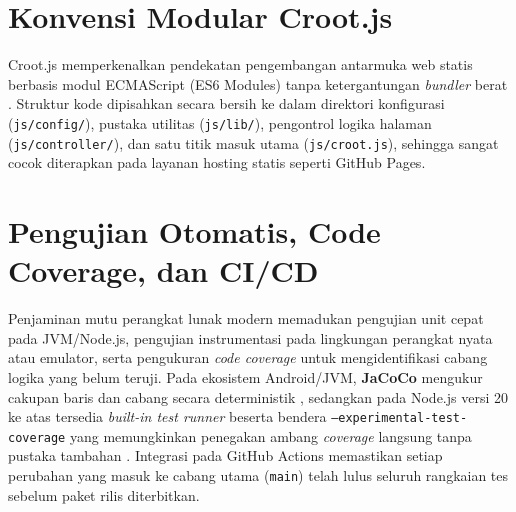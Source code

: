 \section{Konvensi Modular Croot.js}
Croot.js memperkenalkan pendekatan pengembangan antarmuka web statis berbasis modul ECMAScript (ES6 Modules) tanpa ketergantungan \textit{bundler} berat \cite{crootjs_repo}. Struktur kode dipisahkan secara bersih ke dalam direktori konfigurasi (\texttt{js/config/}), pustaka utilitas (\texttt{js/lib/}), pengontrol logika halaman (\texttt{js/controller/}), dan satu titik masuk utama (\texttt{js/croot.js}), sehingga sangat cocok diterapkan pada layanan hosting statis seperti GitHub Pages.

\section{Pengujian Otomatis, Code Coverage, dan CI/CD}
Penjaminan mutu perangkat lunak modern memadukan pengujian unit cepat pada JVM/Node.js, pengujian instrumentasi pada lingkungan perangkat nyata atau emulator, serta pengukuran \textit{code coverage} untuk mengidentifikasi cabang logika yang belum teruji. Pada ekosistem Android/JVM, \textbf{JaCoCo} mengukur cakupan baris dan cabang secara deterministik \cite{jacoco_docs}, sedangkan pada Node.js versi 20 ke atas tersedia \textit{built-in test runner} beserta bendera \texttt{--experimental-test-coverage} yang memungkinkan penegakan ambang \textit{coverage} langsung tanpa pustaka tambahan \cite{nodejs_test_runner}. Integrasi pada GitHub Actions memastikan setiap perubahan yang masuk ke cabang utama (\texttt{main}) telah lulus seluruh rangkaian tes sebelum paket rilis diterbitkan.
